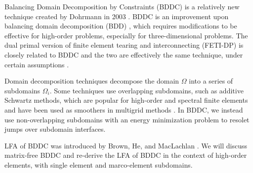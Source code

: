 Balancing Domain Decomposition by Constraints (BDDC) is a relatively new technique created by Dohrmann in 2003 \cite{dohrmann2003preconditioner}.
BDDC is an improvement upon balancing domain decomposition (BDD) \cite{mandel1993balancing}, which requires modifications to be effective for high-order problems, especially for three-dimensional problems.
The dual primal version of finite element tearing and interconnecting (FETI-DP) \cite{farhat2000scalable} is closely related to BDDC and the two are effectively the same technique, under certain assumptions \cite{mandel2007bddc}.

Domain decomposition techniques decompose the domain $\Omega$ into a series of subdomains $\Omega_i$.
Some techniques use overlapping subdomains, such as additive Schwartz methods, which are popular for high-order and spectral finite elements \cite{fischer1997overlapping} and have been used as smoothers in multigrid methods \cite{fischer2005hybrid}.
In BDDC, we instead use non-overlapping subdomains with an energy minimization problem to resolet jumps over subdomain interfaces.

LFA of BDDC was introduced by Brown, He, and MacLachlan \cite{brown2019local}.
We will discuss matrix-free BDDC and re-derive the LFA of BDDC in the context of high-order elements, with single element and marco-element subdomains.
